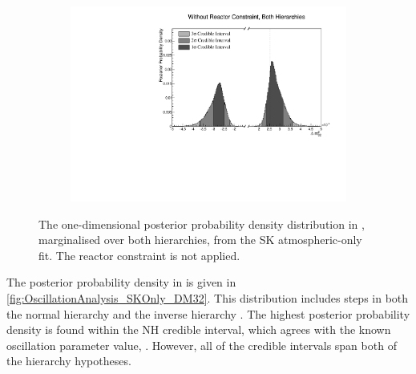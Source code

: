 \begin{figure}[h]
  \begin{subfigure}[t]{0.98\textwidth}
    \includegraphics[width=\textwidth, trim={0mm 0mm 0mm 0mm}, clip,page=1]{Figures/OA/SKOnlyFit/Contours_1D_dm32_BH_1_woRC_UnSmeared_CredibleInterval.pdf}
  \end{subfigure}
  \caption{The one-dimensional posterior probability density distribution in , marginalised over both hierarchies, from the SK atmospheric-only fit. The reactor constraint is not applied.}
  \label{fig:OscillationAnalysis_SKOnly_DM32}
\end{figure}

The posterior probability density in  is given in \autoref{fig:OscillationAnalysis_SKOnly_DM32}. This distribution includes steps in both the normal hierarchy  and the inverse hierarchy . The highest posterior probability density is found within the NH \quickmath{1\sigma} credible interval, which agrees with the known oscillation parameter value, . However, all of the credible intervals span both of the hierarchy hypotheses.

